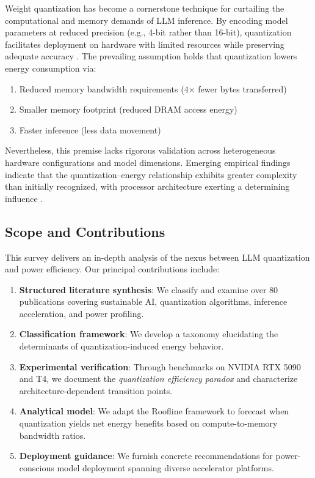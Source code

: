 \documentclass[11pt]{article}
\begin{document}
Weight quantization has become a cornerstone technique for curtailing the computational and memory demands of LLM inference. By encoding model parameters at reduced precision (e.g., 4-bit rather than 16-bit), quantization facilitates deployment on hardware with limited resources while preserving adequate accuracy \cite{dettmers2023qlora, frantar2022gptq}. The prevailing assumption holds that quantization lowers energy consumption via:
\begin{enumerate}
    \item Reduced memory bandwidth requirements (4$\times$ fewer bytes transferred)
    \item Smaller memory footprint (reduced DRAM access energy)
    \item Faster inference (less data movement)
\end{enumerate}

Nevertheless, this premise lacks rigorous validation across heterogeneous hardware configurations and model dimensions. Emerging empirical findings indicate that the quantization--energy relationship exhibits greater complexity than initially recognized, with processor architecture exerting a determining influence \cite{samsi2023words, xu2024quantization}.

\subsection{Scope and Contributions}

This survey delivers an in-depth analysis of the nexus between LLM quantization and power efficiency. Our principal contributions include:

\begin{enumerate}
    \item \textbf{Structured literature synthesis}: We classify and examine over 80 publications covering sustainable AI, quantization algorithms, inference acceleration, and power profiling.
    
    \item \textbf{Classification framework}: We develop a taxonomy elucidating the determinants of quantization-induced energy behavior.
    
    \item \textbf{Experimental verification}: Through benchmarks on NVIDIA RTX 5090 and T4, we document the \textit{quantization efficiency paradox} and characterize architecture-dependent transition points.
    
    \item \textbf{Analytical model}: We adapt the Roofline framework to forecast when quantization yields net energy benefits based on compute-to-memory bandwidth ratios.
    
    \item \textbf{Deployment guidance}: We furnish concrete recommendations for power-conscious model deployment spanning diverse accelerator platforms.
\end{enumerate}
\end{document}
